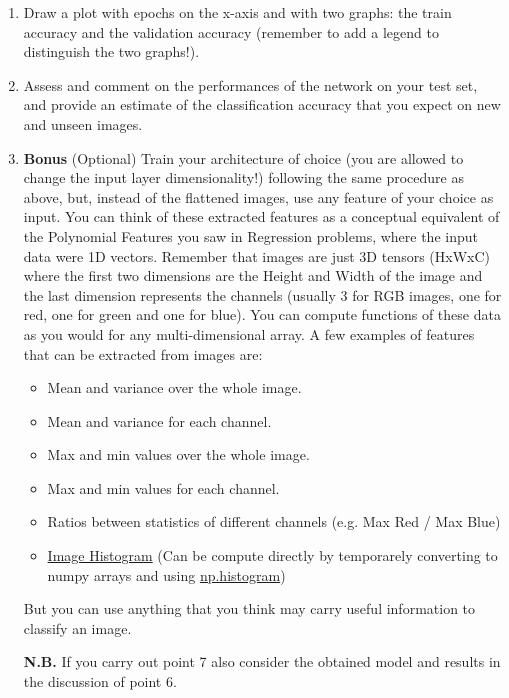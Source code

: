 \documentclass[11pt]{scrartcl}
\begin{document}
\begin{enumerate}
\item Draw a plot with epochs on the x-axis and with two graphs: the train accuracy and the validation accuracy (remember to add a legend to distinguish the two graphs!).
\item Assess and comment on the performances of the network on your test set, and provide an estimate of the classification accuracy that you expect on new and unseen images. 
\item \textbf{Bonus} (Optional) Train your architecture of choice (you are allowed to change the input layer dimensionality!) following the same procedure as above, but, instead of the flattened images, use any feature of your choice as input. 
You can think of these extracted features as a conceptual equivalent of the Polynomial Features you saw in Regression problems, where the input data were 1D vectors. 
Remember that images are just 3D tensors (HxWxC) where the first two dimensions are the Height and Width of the image and the last dimension represents the channels (usually 3 for RGB images, one for red, one for green and one for blue). 
You can compute functions of these data as you would for any multi-dimensional array. 
A few examples of features that can be extracted from images are:
\begin{itemize}
	\item Mean and variance over the whole image.
	\item Mean and variance for each channel.
	\item Max and min values over the whole image.
	\item Max and min values for each channel.
	\item Ratios between statistics of different channels (e.g. Max Red / Max Blue)
	\item \href{https://en.wikipedia.org/wiki/Image_histogram}{Image Histogram} (Can be compute directly by temporarely converting to numpy arrays and using \href{https://numpy.org/doc/stable/reference/generated/numpy.histogram.html}{np.histogram})
\end{itemize}
But you can use anything that you think may carry useful information to classify an image.

\textbf{N.B.} If you carry out point 7 also consider the obtained model and results in the discussion of point 6.
\end{enumerate}

\newpage

\end{document}
